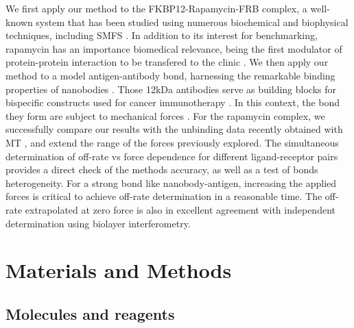 \documentclass{biophys-new}
\begin{document}
We first apply our method to the FKBP12-Rapamycin-FRB complex, a well-known system that has been studied using numerous biochemical \cite{chen1995, leone2006, tao2010} and biophysical \cite{banaszynski2005, flaxman2019, tamura2013, lu2017, choi1996, aylett2016} techniques, including SMFS \cite{kostrz2019, wang2019}. In addition to its interest for benchmarking, rapamycin has an importance biomedical relevance, being the first modulator of protein-protein interaction to be transfered to the clinic \cite{martelli2018, li2014}. We then apply our method to a model antigen-antibody bond, harnessing the remarkable binding properties of nanobodies \cite{chames2020}. Those 12kDa antibodies serve as building blocks for bispecific constructs used for cancer immunotherapy \cite{turini2014}. In this context, the bond they form are subject to mechanical forces \cite{gonzalez2019}. For the rapamycin complex, we successfully compare our results with the unbinding data recently obtained with MT \cite{kostrz2019, wang2019}, and extend the range of the forces previously explored. The simultaneous determination of off-rate vs force dependence for different ligand-receptor pairs provides a direct check of the methods accuracy, as well as a test of bonds heterogeneity. For a strong bond like nanobody-antigen, increasing the applied forces is critical to achieve off-rate determination in a reasonable time. The off-rate extrapolated at zero force is also in excellent agreement with independent determination using biolayer interferometry. %

\section*{Materials and Methods}



\subsection*{Molecules and reagents}


\end{document}
